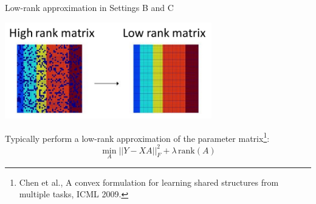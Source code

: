 \documentclass[]{beamer}
\begin{document}
\begin{frame}{Low-rank approximation in Settings B and C}

\begin{center}
\includegraphics[width=9cm]{pics/lowrank}
\end{center}
Typically perform a low-rank approximation of the parameter matrix\footnote{Chen et al., A convex formulation for learning shared structures from
multiple tasks, ICML 2009. }:
$$\min_A ||Y - XA ||^2_F + \lambda \, \mathrm{rank}(A)$$

\end{frame}



\end{document}
